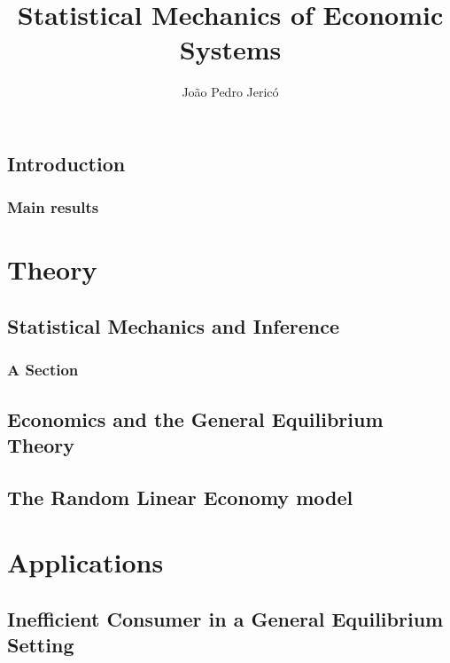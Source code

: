 \documentclass[
  twoside,
  11pt, a4paper,
  footinclude=true,
  headinclude=true,
  cleardoublepage=empty
]{scrbook}
\title{Statistical Mechanics of Economic Systems}
\author{João Pedro Jericó}
\begin{document}
\maketitle








\chapter{Introduction}


\section{Main results}


\part{Theory}


\chapter{Statistical Mechanics and Inference}

\section{A Section}

\chapter{Economics and the General Equilibrium Theory}



\chapter{The Random Linear Economy model}



\part{Applications}

\chapter{Inefficient Consumer in a General Equilibrium Setting}
\end{document}
